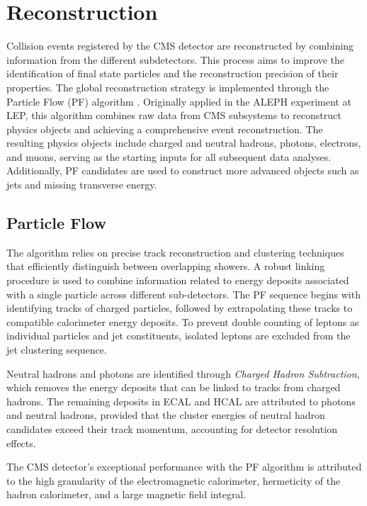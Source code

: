 \chapter{Reconstruction}

Collision events registered by the CMS detector are reconstructed by combining information from the different subdetectors.
This process aims to improve the identification of final state particles and the reconstruction precision of their properties.
The global reconstruction strategy is implemented through the Particle Flow (PF) algorithm \cite{ParticleFlow}.
Originally applied in the ALEPH experiment at LEP, this algorithm combines raw data from CMS subsystems to reconstruct physics objects and achieving a comprehensive event reconstruction.
The resulting physics objects include charged and neutral hadrons, photons, electrons, and muons, serving as the starting inputs for all subsequent data analyses.
Additionally, PF candidates are used to construct more advanced objects such as jets and missing transverse energy.

\section{Particle Flow}
\label{sec:ParticleFlow}
The algorithm relies on precise track reconstruction and clustering techniques that efficiently distinguish between overlapping showers.
A robust linking procedure is used to combine information related to energy deposits associated with a single particle across different sub-detectors.
The PF sequence begins with identifying tracks of charged particles, followed by extrapolating these tracks to compatible calorimeter energy deposits.
To prevent double counting of leptons as individual particles and jet constituents, isolated leptons are excluded from the jet clustering sequence.

Neutral hadrons and photons are identified through \textit{Charged Hadron Subtraction}, which removes the energy deposits that can be linked to tracks from charged hadrons.
The remaining deposits in ECAL and HCAL are attributed to photons and neutral hadrons,
provided that the cluster energies of neutral hadron candidates exceed their track momentum, accounting for detector resolution effects.

The CMS detector's exceptional performance with the PF algorithm is attributed to the high granularity of the electromagnetic calorimeter, hermeticity of the hadron calorimeter, and a large magnetic field integral.

